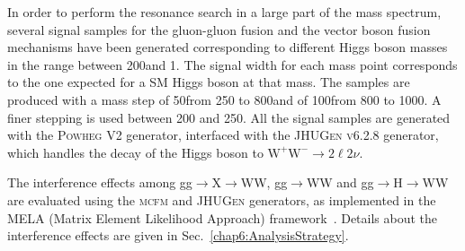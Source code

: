In order to perform the resonance search in a large part of the mass spectrum, several signal samples for the gluon-gluon fusion and the vector boson fusion mechanisms have been generated corresponding to different Higgs boson masses in the range between 200\GeV and 1\TeV. The signal width for each mass point corresponds to the one expected for a SM Higgs boson at that mass. The samples are produced with a mass step of 50\GeV from 250 to 800\GeV and of 100\GeV from 800 to 1000\GeV. A finer stepping is used between 200 and 250\GeV. All the signal samples are generated with the \textsc{Powheg V2} generator, interfaced with the \textsc{JHUGen v6.2.8} generator, which handles the decay of the Higgs boson to $\mathrm{W^+ W^-}\to2\ell2\nu$.

The interference effects among gg$\to$X$\to$WW, gg$\to$WW and gg$\to$H$\to$WW are evaluated using the  \textsc{mcfm} and \textsc{JHUGen} generators, as implemented in the MELA (Matrix Element Likelihood Approach) framework~\cite{JHUGen}. Details about the interference effects are given in Sec.~\ref{chap6:AnalysisStrategy}.
